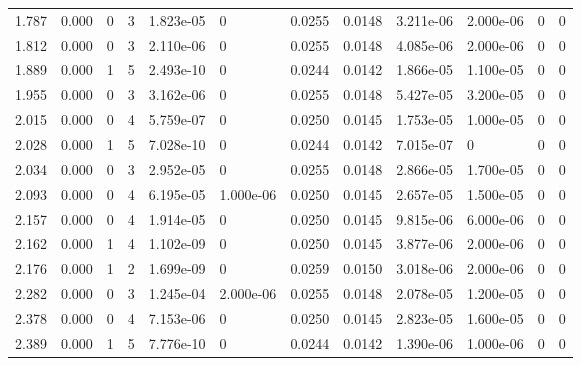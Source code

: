 \documentclass[preview]{standalone}
\begin{document}
{{\begin{tabular}{L{1.2cm}C{1.2cm} C{0.3cm}C{0.5cm} C{1.4cm}C{1.4cm} C{1.4cm}C{1.4cm} C{1.6cm}C{1.6cm} C{1.6cm}C{1.6cm}}
  1.787  &  0.000  & 0     &  3 &  1.823e-05  & 0  &  0.0255&   0.0148& 3.211e-06 & 2.000e-06   &  0 & 0  \\ 
  1.812  &  0.000  & 0     &  3 &  2.110e-06  & 0  &  0.0255&   0.0148& 4.085e-06 & 2.000e-06   &  0 & 0  \\ 
  1.889  &  0.000  & 1     &  5 &  2.493e-10  & 0  &  0.0244&   0.0142& 1.866e-05 & 1.100e-05   &  0 & 0  \\ 
  1.955  &  0.000  & 0     &  3 &  3.162e-06  & 0  &  0.0255&   0.0148& 5.427e-05 & 3.200e-05   &  0 & 0  \\ 
  2.015  &  0.000  & 0     &  4 &  5.759e-07  & 0  &  0.0250&   0.0145& 1.753e-05 & 1.000e-05   &  0 & 0  \\ 
  2.028  &  0.000  & 1     &  5 &  7.028e-10  & 0  &  0.0244&   0.0142& 7.015e-07 & 0   &  0 & 0  \\ 
  2.034  &  0.000  & 0     &  3 &  2.952e-05  & 0  &  0.0255&   0.0148& 2.866e-05 & 1.700e-05   &  0 & 0  \\ 
  2.093  &  0.000  & 0     &  4 &  6.195e-05  & 1.000e-06  &  0.0250&   0.0145& 2.657e-05 & 1.500e-05   &  0 & 0  \\ 
  2.157  &  0.000  & 0     &  4 &  1.914e-05  & 0  &  0.0250&   0.0145& 9.815e-06 & 6.000e-06   &  0 & 0  \\ 
  2.162  &  0.000  & 1     &  4 &  1.102e-09  & 0  &  0.0250&   0.0145& 3.877e-06 & 2.000e-06   &  0 & 0  \\ 
  2.176  &  0.000  & 1     &  2 &  1.699e-09  & 0  &  0.0259&   0.0150& 3.018e-06 & 2.000e-06   &  0 & 0  \\ 
  2.282  &  0.000  & 0     &  3 &  1.245e-04  & 2.000e-06  &  0.0255&   0.0148& 2.078e-05 & 1.200e-05   &  0 & 0  \\ 
  2.378  &  0.000  & 0     &  4 &  7.153e-06  & 0  &  0.0250&   0.0145& 2.823e-05 & 1.600e-05   &  0 & 0  \\ 
  2.389  &  0.000  & 1     &  5 &  7.776e-10  & 0  &  0.0244&   0.0142& 1.390e-06 & 1.000e-06   &  0 & 0  \\ 
\hline 
\end{tabular} 

}}
\end{document}
